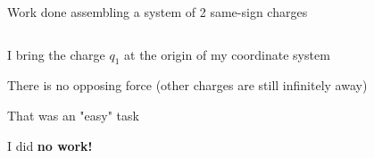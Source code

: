 \begin{frame}{Work done assembling a system of 2 same-sign charges}
\begin{columns}
\begin{column}{0.54\textwidth}
\begin{itemize}
{    \vspace{0.2cm}
    \item I bring the charge $q_{1}$ at the origin of my coordinate system
       \begin{itemize}
       {\small
          \item There is no opposing force (other charges are still infinitely away)
       }
       \end{itemize}
    \vspace{0.2cm}
    \item That was an "easy" task
       \begin{itemize}
       {\small
         \item I did {\bf no work!}
       }
       \end{itemize}
   }
   \end{itemize}
  \end{column}
\end{columns}

\end{frame}


%
%
%

